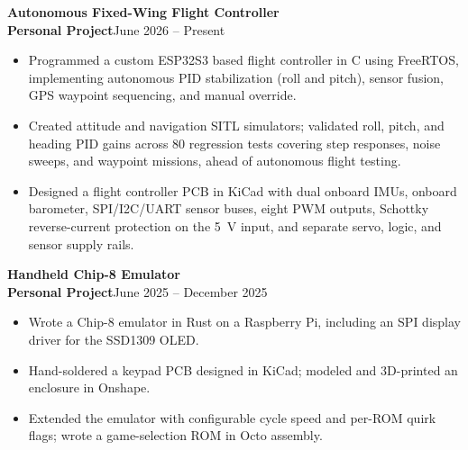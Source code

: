 \documentclass[10pt]{article}
\newcommand{\entry}[3]{%
  \noindent\textbf{#1}\\%
  \noindent\textbf{#2}\hfill#3%
}
\begin{document}
\entry{Autonomous Fixed-Wing Flight Controller}{Personal Project}{June 2026 – Present}
\begin{itemize}
  \item Programmed a custom ESP32S3 based flight controller in C using FreeRTOS, implementing autonomous PID stabilization (roll and pitch), sensor fusion, GPS waypoint sequencing, and manual override.
  \item Created attitude and navigation SITL simulators; validated roll, pitch, and heading PID gains across 80 regression tests covering step responses, noise sweeps, and waypoint missions, ahead of autonomous flight testing.
  \item Designed a flight controller PCB in KiCad with dual onboard IMUs, onboard barometer, SPI/I2C/UART sensor buses, eight PWM outputs, Schottky reverse-current protection on the 5~V input, and separate servo, logic, and sensor supply rails.
\end{itemize}

\vspace{3pt}
\entry{Handheld Chip-8 Emulator}{Personal Project}{June 2025 – December 2025}
\begin{itemize}
  \item Wrote a Chip-8 emulator in Rust on a Raspberry Pi, including an SPI display driver for the SSD1309 OLED.
  \item Hand-soldered a keypad PCB designed in KiCad; modeled and 3D-printed an enclosure in Onshape.
  \item Extended the emulator with configurable cycle speed and per-ROM quirk flags; wrote a game-selection ROM in Octo assembly.
\end{itemize}

\vfill
\end{document}
